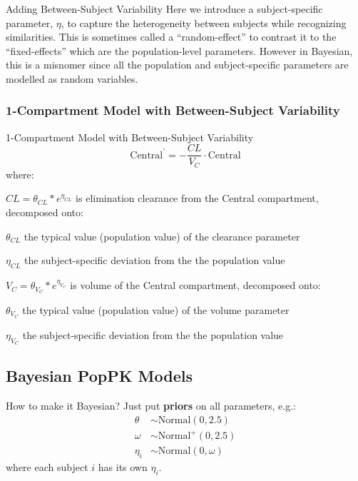 \begin{frame}{Adding Between-Subject Variability}
    Here we introduce a subject-specific parameter, $\eta$,
    to capture the heterogeneity between subjects
    while recognizing similarities.
    \vfill
    This is sometimes called a ``random-effect'' to contrast it to the ``fixed-effects'' which are the population-level parameters.
    \vfill
    However in Bayesian, this is a misnomer since all the population and subject-specific parameters are modelled as random variables.
\end{frame}

\subsubsection{1-Compartment Model with Between-Subject Variability}
\begin{frame}{1-Compartment Model with Between-Subject Variability}
    $$
        \text{Central}^{\prime} = -\frac{CL}{V_C} \cdot \text{Central}
    $$
    where:
    \begin{vfilleditems}
        \item $CL = \theta_{CL} * e^{\eta_{CL}}$ is elimination clearance from the Central compartment,
        decomposed onto:
        \begin{vfilleditems}
            \item $\theta_{CL}$ the typical value (population value) of the clearance parameter
            \item $\eta_{CL}$ the subject-specific deviation from the the population value
        \end{vfilleditems}
        \item $V_C = \theta_{V_C} * e^{\eta_{V_C}}$ is volume of the Central compartment,
        decomposed onto:
        \begin{vfilleditems}
            \item $\theta_{V_C}$ the typical value (population value) of the volume parameter
            \item $\eta_{V_C}$ the subject-specific deviation from the the population value
        \end{vfilleditems}
    \end{vfilleditems}
\end{frame}

\subsection{Bayesian PopPK Models}
\begin{frame}{How to make it Bayesian?}
    Just put \textbf{priors} on all parameters, e.g.:
    $$
        \begin{aligned}
            \theta   & \sim \text{Normal}(0, 2.5)  \\
            \omega   & \sim \text{Normal}^+(0, 2.5)  \\
            \eta_{i} & \sim \text{Normal}(0, \omega)
        \end{aligned}
    $$
    \vfill
    where each subject $i$ has its own $\eta_i$.
\end{frame}
